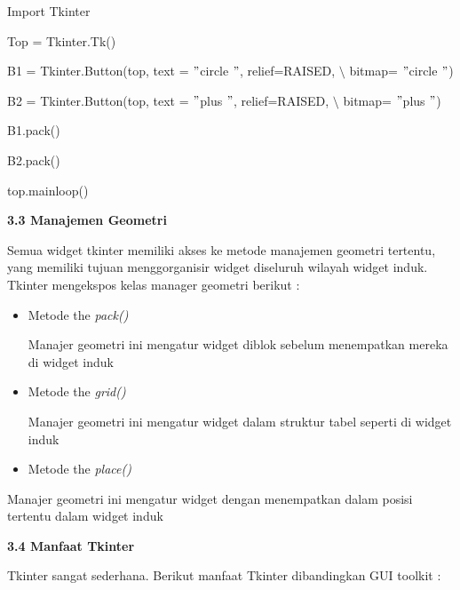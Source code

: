 \documentclass [12pt,a4paper,notitlepage,oneside,bahasa]{article}
\begin{document}
{\fontsize{10pt}{10pt}\selectfont Import Tkinter} \par
\vspace{10pt}
{\fontsize{10pt}{10pt}\selectfont Top = Tkinter.Tk()} \par
\vspace{10pt}
{\fontsize{10pt}{10pt}\selectfont B1 = Tkinter.Button(top, text = $ " $circle $ " $, relief=RAISED,  $  \setminus  $ bitmap= $ " $circle $ " $)} \par
{\fontsize{10pt}{10pt}\selectfont B2 = Tkinter.Button(top, text = $ " $plus $ " $, relief=RAISED,  $  \setminus  $ bitmap= $ " $plus $ " $)} \par
\vspace{10pt}
{\fontsize{10pt}{10pt}\selectfont B1.pack()} \par
{\fontsize{10pt}{10pt}\selectfont B2.pack()} \par
{\fontsize{10pt}{10pt}\selectfont top.mainloop()} \par
\vspace{10pt}
\noindent 
\textbf{3.3 Manajemen Geometri} \par
\noindent 
 \hspace*{0.5in} Semua widget tkinter memiliki akses ke metode manajemen geometri tertentu, yang memiliki tujuan menggorganisir widget diseluruh wilayah widget induk. Tkinter mengekspos kelas manager geometri berikut : \par
\noindent 
\begin{itemize}
\item Metode the \textit{pack()} \par
\noindent 
Manajer geometri ini mengatur widget diblok sebelum menempatkan mereka di widget induk \par
\noindent 
\item Metode the \textit{grid()} \par
\noindent 
Manajer geometri ini mengatur widget dalam struktur tabel seperti di widget induk \par
\noindent 
\item Metode the  \textit{place()}\end{itemize} \par
\noindent 
Manajer geometri ini mengatur widget dengan menempatkan dalam posisi tertentu dalam widget induk \par
\vspace{12pt}
\noindent 
\textbf{3.4 Manfaat Tkinter} \par
Tkinter sangat sederhana. Berikut manfaat Tkinter dibandingkan GUI toolkit : \par
\end{document}
